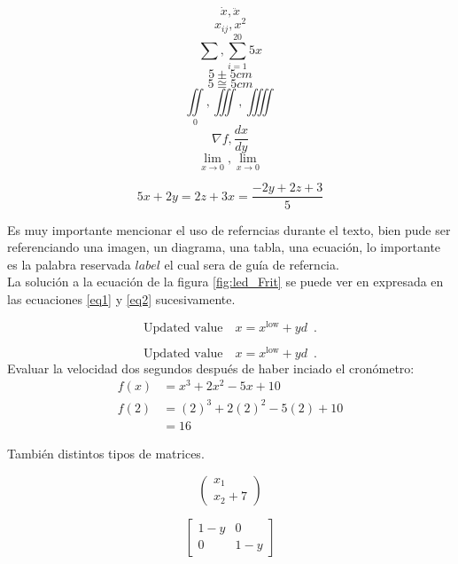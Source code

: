 \documentclass[journal, spanish]{IEEEtran}
\begin{document}
$$\dot{x},\ddot{x}$$
$$ x_{ij},x^{2} $$
$$\sum, \sum_{i=1}^{20}{5x}$$
$$5\pm{5cm}$$
$$5\cong{5cm}$$
$$\iint\limits_0, \iiint\limits, \iiiint$$
$$\nabla{f}, \frac{dx}{dy}$$
$$\lim_{x\to 0}, \underset{x\to 0}{\lim}$$

\begin{subequations}
    \begin{equation}
        5x+2y = 2z+3 \label{eq1}
    \end{equation}
    \begin{equation}
        \boxed {x = \frac{-2y+2z+3}{5}} \label{eq2}
    \end{equation}
\end{subequations}

\noindent Es muy importante mencionar el uso de referncias durante el texto, bien pude ser referenciando una imagen, un diagrama, una tabla, una ecuación, lo importante es la palabra reservada $label$ el cual sera de guía de referncia. \\

\noindent La solución a la ecuación de la figura \ref{fig:led_Frit} se puede ver en expresada en las ecuaciones \eqref{eq1} y \eqref{eq2} sucesivamente.

\begin{equation*}
    \mbox{Updated value}\quad x= x^\mathrm{low} + yd \enspace.
\end{equation*}

\begin{equation}
    \mbox{Updated value}\quad x= x^\mathrm{low} + yd \enspace.    
\end{equation}
\noindent Evaluar la velocidad dos segundos después de haber inciado el cronómetro:
\begin{equation*}
    \begin{split}
        f(x) &= x^3 + 2x^2 - 5x + 10\\
        f(2) &= (2)^3 + 2(2)^2 - 5(2) + 10\\
        &= 16
    \end{split}
\end{equation*}

\noindent También distintos tipos de matrices.

\begin{equation*}
    \begin{pmatrix} x_1 \\ x_2+7 \end{pmatrix}
\end{equation*}

\begin{equation*}
    \begin{bmatrix} 1-y & 0 \\ 0 & 1-y \end{bmatrix}
\end{equation*} 
\end{document}
